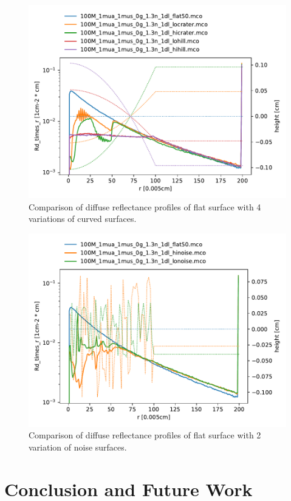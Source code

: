 \documentclass[]{article}
\begin{document}
\begin{figure}[ht!]
	\includegraphics[width=\linewidth]{img/result2.pdf}
	\caption{Comparison of diffuse reflectance profiles of flat surface with 4 variations of curved surfaces.}
	\label{result2}
\end{figure}

\begin{figure}[ht!]
\includegraphics[width=\linewidth]{img/result3.pdf}
\caption{Comparison of diffuse reflectance profiles of flat surface with 2 variation of noise surfaces.}
\label{result3}
\end{figure}

\section{Conclusion and Future Work}


\end{document}
